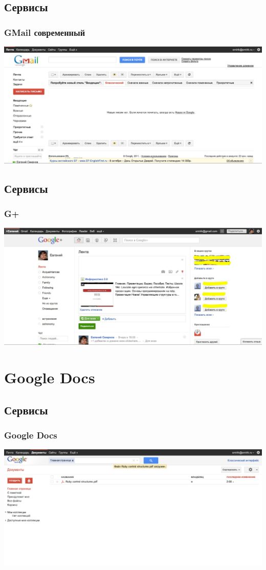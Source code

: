 \documentclass[compress,red]{beamer}
\begin{document}
\subsection{Сервисы}
\begin{frame}
  \frametitle{GMail современный}
	\centerline{\includegraphics[width=1.0\textwidth]{images/gmail-new.jpg}}
\end{frame}

\subsection{Сервисы}
\begin{frame}
  \frametitle{G+}
	\centerline{\includegraphics[width=1.0\textwidth]{images/gplus1.jpg}}
\end{frame}

\section{Google Docs}
\subsection{Сервисы}
\begin{frame}
  \frametitle{Google Docs}
	\centerline{\includegraphics[width=1.0\textwidth]{images/gdocs1.jpg}}
\end{frame}
\end{document}
